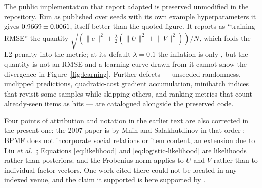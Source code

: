 \documentclass[conference]{IEEEtran}
\begin{document}
The public implementation that report adapted is preserved unmodified in the repository.
Run as published over \LegacySeeds{} seeds with its own example hyperparameters it gives
$0.9669{} \pm 0.0061$, itself better than the quoted figure. It reports as
``training RMSE'' the quantity
$\sqrt{(\lVert e\rVert^2 + \tfrac{\lambda}{2}(\lVert U\rVert^2 + \lVert V\rVert^2))/N}$,
which folds the L2 penalty into the metric; at its default $\lambda = 0.1$ the inflation is
only \LegacyPenaltyInflation, but the quantity is not an RMSE and a learning curve drawn
from it cannot show the divergence in Figure~\ref{fig:learning}. Further defects ---
unseeded randomness, unclipped predictions, quadratic-cost gradient accumulation, minibatch
indices that revisit some samples while skipping others, and ranking metrics that count
already-seen items as hits --- are catalogued alongside the preserved code.

Four points of attribution and notation in the earlier text are also corrected in the
present one: the 2007 paper is by Mnih and Salakhutdinov in that order
\cite{mnih2007probabilistic}; BPMF \cite{salakhutdinov2008bayesian} does not incorporate
social relations or item content, an extension due to Liu \emph{et al.}\
\cite{liu2013bayesian}; Equations \eqref{eq:likelihood} and \eqref{eq:logistic-likelihood}
are likelihoods rather than posteriors; and the Frobenius norm applies to $U$ and $V$
rather than to individual factor vectors. One work cited there could not be located in any
indexed venue, and the claim it supported is here supported by \cite{koren2009matrix}.


\end{document}
